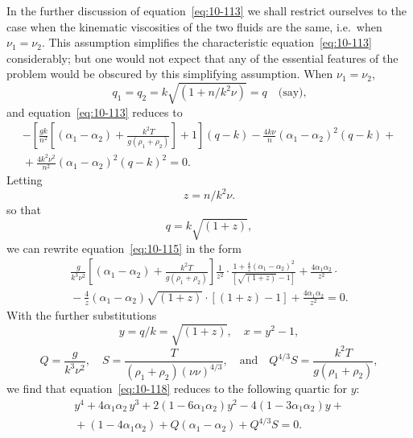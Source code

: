 In the further discussion of equation~\eqref{eq:10-113} we shall restrict ourselves to the case when the kinematic viscosities of the two fluids are the same, i.e.\ when $\nu_1 = \nu_2$. This assumption simplifies the characteristic equation~\eqref{eq:10-113} considerably; but one would not expect that any of the essential features of the problem would be obscured by this simplifying assumption. When $\nu_1 = \nu_2$,
\begin{equation}
\label{eq:10-114}
q_1 = q_2 = k\sqrt{(1+n/k^2\nu)} = q \quad\text{(say),}
\end{equation}
and equation~\eqref{eq:10-113} reduces to
\begin{align}
\label{eq:10-115}
-\left[\frac{gk}{n^2}\!\left[(\alpha_1-\alpha_2)+\frac{k^2T}{g(\rho_1+\rho_2)}\right]+1\right](q-k) - \frac{4k\nu}{n}(\alpha_1-\alpha_2)^2(q-k) + {} \nonumber\\
{} + \frac{4k^2\nu^2}{n^2}(\alpha_1-\alpha_2)^2(q-k)^2 = 0.
\end{align}
Letting
\begin{equation}
z = n/k^2\nu. \label{eq:10-117}
\end{equation}
so that
\begin{equation}
q = k\sqrt{(1+z)},
\end{equation}
we can rewrite equation~\eqref{eq:10-115} in the form
\begin{align}
\label{eq:10-118}
\frac{g}{k^3\nu^2}\!\left[(\alpha_1-\alpha_2)+\frac{k^2T}{g(\rho_1+\rho_2)}\right]\frac{1}{z^2}\cdot\frac{1+\frac{4}{z}(\alpha_1-\alpha_2)^2}{[\sqrt{(1+z)}-1]} + \frac{4\alpha_1\alpha_2}{z^2}\cdot {} \nonumber\\
{} - \frac{4}{z}(\alpha_1-\alpha_2)\sqrt{(1+z)}\cdot[(1+z)-1] + \frac{4\alpha_1\alpha_2}{z^2} = 0.
\end{align}
With the further substitutions
\begin{equation}
\label{eq:10-119}
y = q/k = \sqrt{(1+z)}, \quad x = y^2-1,
\end{equation}
\begin{equation}
\label{eq:10-120}
Q = \frac{g}{k^3\nu^2}, \quad S = \frac{T}{(\rho_1+\rho_2)(\nu\nu)^{4/3}}, \quad\text{and}\quad Q^{4/3}S = \frac{k^2T}{g(\rho_1+\rho_2)},
\end{equation}
we find that equation~\eqref{eq:10-118} reduces to the following quartic for $y$:
\begin{align}
\label{eq:10-121}
y^4+4\alpha_1\alpha_2\,y^3+2(1-6\alpha_1\alpha_2)y^2-4(1-3\alpha_1\alpha_2)y + {} \nonumber\\
{} + (1-4\alpha_1\alpha_2)+Q(\alpha_1-\alpha_2)+Q^{4/3}S = 0.
\end{align}


